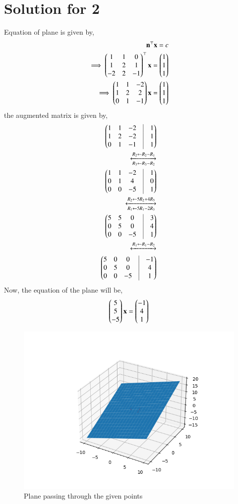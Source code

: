 \documentclass[A4,11pt,twocolumn]{IEEEtran}
\begin{document}
\section{Solution for 2}
Equation of plane is given by,
\begin{align}
\mathbf{n}^\top \mathbf{x} = c\\
\implies \begin{pmatrix}1&1&0\\1&2&1\\-2&2&-1\end{pmatrix}^\top \mathbf{x}=\begin{pmatrix}1\\1\\1\end{pmatrix}\\
\implies \begin{pmatrix}1&1&-2\\1&2&2\\0&1&-1\end{pmatrix} \mathbf{x}=\begin{pmatrix}1\\1\\1\end{pmatrix}\\
\end{align}
the augmented matrix is given by,
\begin{align}
\myvec{1&1&-2&\vrule&1\\1&2&-2&\vrule&1\\0&1&-1&\vrule&1}\\
\xleftrightarrow[R_3 \leftarrow R_3 - R_2]{R_2 \leftarrow R_2 - R_1}\\
\myvec{1&1&-2&\vrule&1\\0&1&4&\vrule&0\\0&0&-5&\vrule&1}\\
\xleftrightarrow[R_1 \leftarrow 5R_1 - 2R_3]{R_2 \leftarrow 5R_2 + 4R_3}\\
\myvec{5&5&0&\vrule&3\\0&5&0&\vrule&4\\0&0&-5&\vrule&1}\\
\xleftrightarrow{R_1 \leftarrow R_1 - R_2}\\
\myvec{5&0&0&\vrule&-1\\0&5&0&\vrule&4\\0&0&-5&\vrule&1}
\end{align}
Now, the equation of the plane will be,
\begin{align}
\begin{pmatrix}5\\5\\-5\end{pmatrix} \mathbf{x} = \begin{pmatrix}-1\\4\\1\end{pmatrix}
\end{align}
\begin{figure}[h!]
  \centering
   \includegraphics[width=\columnwidth]{figs/plane_b.png}
    \caption{Plane passing through the given points }
     \label{fig:2}
     \end{figure} 
\end{document}

